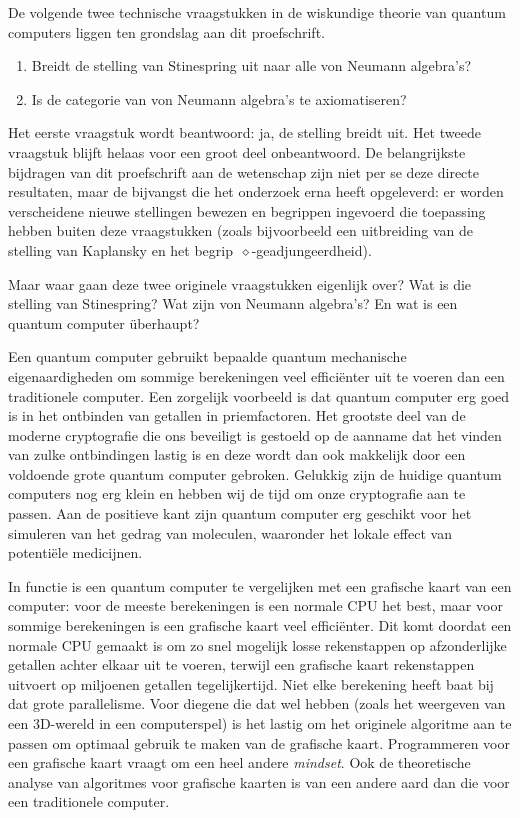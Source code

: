     
De volgende twee technische vraagstukken
    in de wiskundige theorie van quantum computers
    liggen ten grondslag aan dit proefschrift.
\begin{enumerate}
\item 
    Breidt de stelling van Stinespring uit naar
        alle von Neumann algebra's?
\item
    Is de categorie van von Neumann algebra's te axiomatiseren?
\end{enumerate}
Het eerste vraagstuk wordt beantwoord: ja, de stelling breidt uit.
Het tweede vraagstuk blijft helaas voor een groot deel onbeantwoord.
De belangrijkste bijdragen van dit proefschrift aan de wetenschap
    zijn niet per se deze directe resultaten,
    maar de bijvangst die het onderzoek erna heeft opgeleverd:
    er worden verscheidene nieuwe stellingen bewezen
        en begrippen ingevoerd
    die toepassing hebben buiten deze vraagstukken
    (zoals bijvoorbeeld een uitbreiding van de stelling
        van Kaplansky en het begrip~$\diamond$-geadjungeerdheid).

Maar waar gaan deze twee originele vraagstukken eigenlijk over?
Wat is die stelling van Stinespring?
Wat zijn von Neumann algebra's?
En wat is een quantum computer \"uberhaupt?

Een quantum computer gebruikt
       bepaalde quantum mechanische eigenaardigheden
    om sommige berekeningen veel effici\"enter uit
    te voeren dan een traditionele computer.
Een zorgelijk voorbeeld is
    dat quantum computer
    erg goed is in het ontbinden van getallen in priemfactoren.
Het grootste deel van de moderne cryptografie
        die ons beveiligt is gestoeld op de aanname
        dat het vinden van zulke ontbindingen lastig is
        en deze wordt dan ook makkelijk door
        een voldoende grote quantum computer gebroken.
Gelukkig zijn de huidige quantum computers nog erg klein
    en hebben wij de tijd om onze cryptografie aan te passen.
Aan de positieve kant zijn
    quantum computer erg geschikt voor het simuleren
    van het gedrag van moleculen,
    waaronder het lokale effect van potenti\"ele medicijnen.

In functie is een quantum computer te vergelijken met
        een grafische kaart van een computer:
    voor de meeste berekeningen is een normale CPU het best,
            maar voor sommige berekeningen
        is een grafische kaart veel effici\"enter.
Dit komt doordat een normale CPU gemaakt is om zo snel mogelijk
    losse rekenstappen op afzonderlijke getallen
    achter elkaar uit te voeren,
    terwijl een grafische kaart rekenstappen
    uitvoert op miljoenen getallen tegelijkertijd.
Niet elke berekening heeft baat bij dat grote parallelisme.
Voor diegene die dat wel hebben (zoals het
    weergeven van een 3D-wereld in een computerspel)
    is het lastig om het originele algoritme aan te passen
    om optimaal gebruik te maken van de grafische kaart.
    Programmeren voor een grafische kaart vraagt om een
    heel andere \emph{mindset}.
Ook de theoretische analyse van algoritmes voor grafische kaarten
    is van een andere aard dan die voor een traditionele computer.

